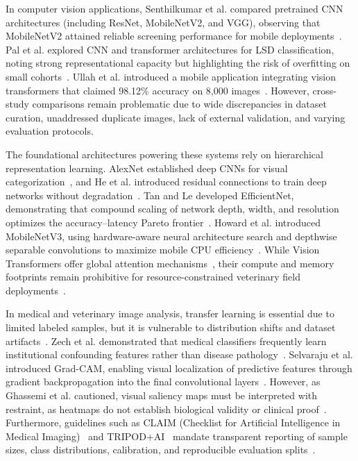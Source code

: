 \documentclass[conference]{IEEEtran}
\begin{document}
In computer vision applications, Senthilkumar et al. compared pretrained CNN architectures (including ResNet, MobileNetV2, and VGG), observing that MobileNetV2 attained reliable screening performance for mobile deployments~\cite{senthilkumar2024early}. Pal et al. explored CNN and transformer architectures for LSD classification, noting strong representational capacity but highlighting the risk of overfitting on small cohorts~\cite{pal2025implementation}. Ullah et al. introduced a mobile application integrating vision transformers that claimed 98.12\% accuracy on 8,000 images~\cite{ullah2026vision}. However, cross-study comparisons remain problematic due to wide discrepancies in dataset curation, unaddressed duplicate images, lack of external validation, and varying evaluation protocols.

The foundational architectures powering these systems rely on hierarchical representation learning. AlexNet established deep CNNs for visual categorization~\cite{krizhevsky2012imagenet}, and He et al. introduced residual connections to train deep networks without degradation~\cite{he2016deep}. Tan and Le developed EfficientNet, demonstrating that compound scaling of network depth, width, and resolution optimizes the accuracy--latency Pareto frontier~\cite{tan2019efficientnet}. Howard et al. introduced MobileNetV3, using hardware-aware neural architecture search and depthwise separable convolutions to maximize mobile CPU efficiency~\cite{howard2019searching}. While Vision Transformers offer global attention mechanisms~\cite{dosovitskiy2021image}, their compute and memory footprints remain prohibitive for resource-constrained veterinary field deployments~\cite{kelly2019key}.

In medical and veterinary image analysis, transfer learning is essential due to limited labeled samples, but it is vulnerable to distribution shifts and dataset artifacts~\cite{litjens2017survey, zech2018variable}. Zech et al. demonstrated that medical classifiers frequently learn institutional confounding features rather than disease pathology~\cite{zech2018variable}. Selvaraju et al. introduced Grad-CAM, enabling visual localization of predictive features through gradient backpropagation into the final convolutional layers~\cite{selvaraju2017gradcam}. However, as Ghassemi et al. cautioned, visual saliency maps must be interpreted with restraint, as heatmaps do not establish biological validity or clinical proof~\cite{ghassemi2021false}. Furthermore, guidelines such as CLAIM (Checklist for Artificial Intelligence in Medical Imaging)~\cite{mongan2020checklist} and TRIPOD+AI~\cite{collins2024tripod} mandate transparent reporting of sample sizes, class distributions, calibration, and reproducible evaluation splits~\cite{kapoor2023leakage, vancalster2019calibration}.
\end{document}
